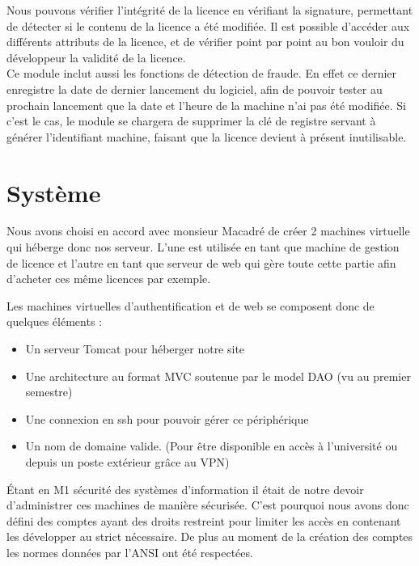 Nous pouvons vérifier l'intégrité de la licence en vérifiant la signature, 
permettant de détecter si le contenu de la licence a été modifiée. Il est 
possible d'accéder aux différents attributs de la licence, et de vérifier 
point par point au bon vouloir du développeur la validité de la licence.\\
Ce module inclut aussi les fonctions de détection de fraude. En effet ce 
dernier enregistre la date de dernier lancement du logiciel, afin de pouvoir 
tester au prochain lancement que la date et l'heure de la machine n'ai pas été
modifiée. Si c'est le cas, le module se chargera de supprimer la clé de registre
servant à générer l'identifiant machine, faisant que la licence devient 
à présent inutilisable.

\chapter{Système}

Nous avons choisi en accord avec monsieur Macadré de créer 2 machines virtuelle qui héberge donc nos serveur. L'une est utilisée en tant que machine de gestion de licence 
et l'autre en tant que serveur de web qui gère toute cette partie afin d'acheter ces même licences par exemple.\newline

Les machines virtuelles d'authentification et de web se composent donc de quelques éléments :\newline

\begin{itemize}
	\item Un serveur Tomcat pour héberger notre site
	\item Une architecture au format MVC soutenue par le model DAO (vu au premier semestre)
	\item Une connexion en ssh pour pouvoir gérer ce périphérique
	\item Un nom de domaine valide. (Pour être disponible en accès à l'université ou depuis un poste extérieur grâce au VPN)\newline
\end{itemize}

Étant en M1 sécurité des systèmes d'information il était de notre devoir d'administrer ces machines de manière sécurisée.
C'est pourquoi nous avons donc défini des comptes ayant des droits restreint pour limiter les accès en contenant les développer au strict nécessaire.
De plus au moment de la création des comptes les normes données par l'ANSI ont été respectées.

